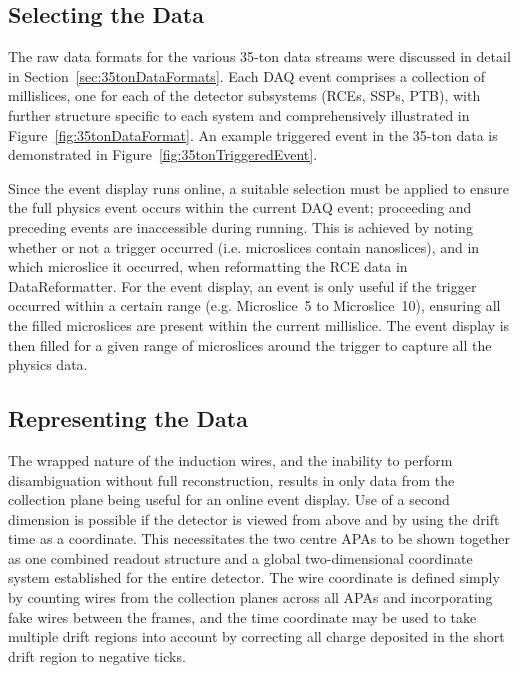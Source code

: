 \subsection{Selecting the Data}\label{sec:SelectingEVDData}

The raw data formats for the various 35-ton data streams were discussed in detail in Section~\ref{sec:35tonDataFormats}.  Each DAQ event comprises a collection of millislices, one for each of the detector subsystems (RCEs, SSPs, PTB), with further structure specific to each system and comprehensively illustrated in Figure~\ref{fig:35tonDataFormat}.  An example triggered event in the 35-ton data is demonstrated in Figure~\ref{fig:35tonTriggeredEvent}.

Since the event display runs online, a suitable selection must be applied to ensure the full physics event occurs within the current DAQ event; proceeding and preceding events are inaccessible during running.  This is achieved by noting whether or not a trigger occurred (i.e. microslices contain nanoslices), and in which microslice it occurred, when reformatting the RCE data in DataReformatter.  For the event display, an event is only useful if the trigger occurred within a certain range (e.g. Microslice~5 to Microslice~10), ensuring all the filled microslices are present within the current millislice.  The event display is then filled for a given range of microslices around the trigger to capture all the physics data.

\subsection{Representing the Data}\label{RepresentingEVDData}

The wrapped nature of the induction wires, and the inability to perform disambiguation without full reconstruction, results in only data from the collection plane being useful for an online event display.  Use of a second dimension is possible if the detector is viewed from above and by using the drift time as a coordinate.  This necessitates the two centre APAs to be shown together as one combined readout structure and a global two-dimensional coordinate system established for the entire detector.  The wire coordinate is defined simply by counting wires from the collection planes across all APAs and incorporating fake wires between the frames, and the time coordinate may be used to take multiple drift regions into account by correcting all charge deposited in the short drift region to negative ticks.

